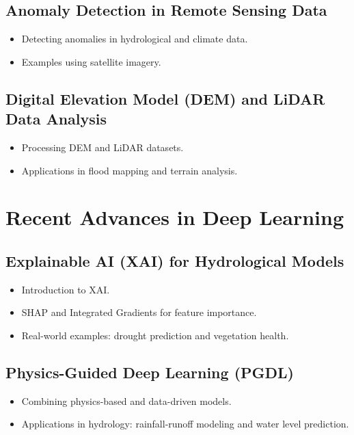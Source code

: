 \chapter{Anomaly Detection in Remote Sensing Data}
\begin{itemize}
    \item Detecting anomalies in hydrological and climate data.
    \item Examples using satellite imagery.
\end{itemize}

\chapter{Digital Elevation Model (DEM) and LiDAR Data Analysis}
\begin{itemize}
    \item Processing DEM and LiDAR datasets.
    \item Applications in flood mapping and terrain analysis.
\end{itemize}

\part{Recent Advances in Deep Learning}

\chapter{Explainable AI (XAI) for Hydrological Models}
\begin{itemize}
    \item Introduction to XAI.
    \item SHAP and Integrated Gradients for feature importance.
    \item Real-world examples: drought prediction and vegetation health.
\end{itemize}

\chapter{Physics-Guided Deep Learning (PGDL)}
\begin{itemize}
    \item Combining physics-based and data-driven models.
    \item Applications in hydrology: rainfall-runoff modeling and water level prediction.
\end{itemize}










